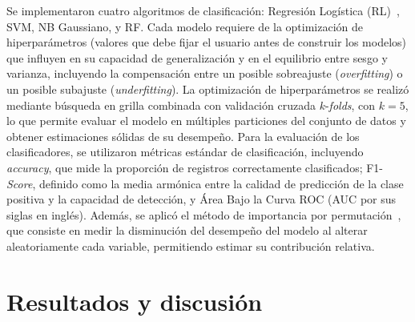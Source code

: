 \documentclass{llncs}
\begin{document}
Se implementaron cuatro algoritmos de clasificación: Regresión Logística (RL)~\parencite{cramer2002origins}, SVM, NB Gaussiano, y RF. Cada modelo requiere de la optimización de  hiperparámetros (valores que debe fijar el usuario antes de construir los modelos) que influyen en su capacidad de generalización y en el equilibrio entre sesgo y varianza, incluyendo la compensación entre un posible sobreajuste (\emph{overfitting}) o un posible subajuste (\emph{underfitting}).
La optimización de hiperparámetros se realizó mediante búsqueda en grilla combinada con validación cruzada $k$-\emph{folds}, con $k=5$, lo que permite evaluar el modelo en múltiples particiones del conjunto de datos y obtener estimaciones sólidas de su desempeño.
Para la evaluación de los clasificadores, se utilizaron métricas estándar de clasificación, incluyendo \emph{accuracy}, que mide la proporción de registros correctamente clasificados; F1-\emph{Score}, definido como la media armónica entre la calidad de predicción de la clase positiva y la capacidad de detección, y Área Bajo la Curva ROC (AUC por sus siglas en inglés). Además, se aplicó el método de importancia por permutación~\parencite{breiman2017classification}, que consiste en medir la disminución del desempeño del modelo al alterar aleatoriamente cada variable, permitiendo estimar su contribución relativa.	

\section{Resultados y discusión}
\end{document}

